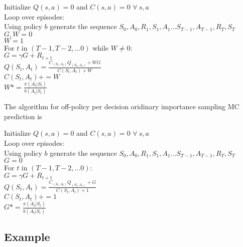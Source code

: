 \documentclass[11pt,a4paper]{article}
\begin{document}
\begin{tcolorbox}[enhanced,title=Off-policy weighted importance sampling prediction]
Initialize $Q(s,a)=0$ and $C(s,a)=0$ $\forall~s,a$ \\
Loop over episodes: \\
 \phantom{abcd} Using policy $b$ generate the sequence  $S_0,A_0, R_1,S_1,A_1 \dots S_{T-1}, A_{T-1},R_T,S_T$ \\
 \phantom{abcd} $G,W=0$ \\
  \phantom{abcd} $W=1$ \\
  \phantom{abcd} For $t$ in $(T-1,T-2,\dots 0)$ while $W \ne 0$: \\
  \phantom{abcd}   \phantom{abcd}  $G = \gamma G + R_{t+1}$ \\
  \phantom{abcd}   \phantom{abcd}  $Q(S_t,A_t) = \frac{C_(S_t,A_t) Q_(S_t,A_t) +W G}{C(S_t,A_t)+W}$ \\
    \phantom{abcd}   \phantom{abcd}  $C(S_t,A_t) += W$ \\
    \phantom{abcd}   \phantom{abcd}  $W*= \frac{\pi(A_t|S_t)}{b(A_t|S_t)}$   
\end{tcolorbox}
The algorithm for off-policy per decision oridinary importance sampling MC prediction is

\begin{tcolorbox}[enhanced,title=Off-policy ordinary importance sampling prediction]
Initialize $Q(s,a)=0$ and $C(s,a)=0$ $\forall~s,a$ \\
Loop over episodes: \\
 \phantom{abcd} Using policy $b$ generate the sequence  $S_0,A_0, R_1,S_1,A_1 \dots S_{T-1}, A_{T-1},R_T,S_T$ \\
 \phantom{abcd} $G=0$ \\
  \phantom{abcd} For $t$ in $(T-1,T-2,\dots 0)$: \\
  \phantom{abcd}   \phantom{abcd}  $G = \gamma G + R_{t+1}$ \\
  \phantom{abcd}   \phantom{abcd}  $Q(S_t,A_t) = \frac{C_(S_t,A_t) Q_(S_t,A_t) + G}{C(S_t,A_t)+1}$ \\
    \phantom{abcd}   \phantom{abcd}  $C(S_t,A_t) += 1$ \\
    \phantom{abcd}   \phantom{abcd}  $G*= \frac{\pi(A_t|S_t)}{b(A_t|S_t)}$   
\end{tcolorbox}

\subsection{Example}
\end{document}
